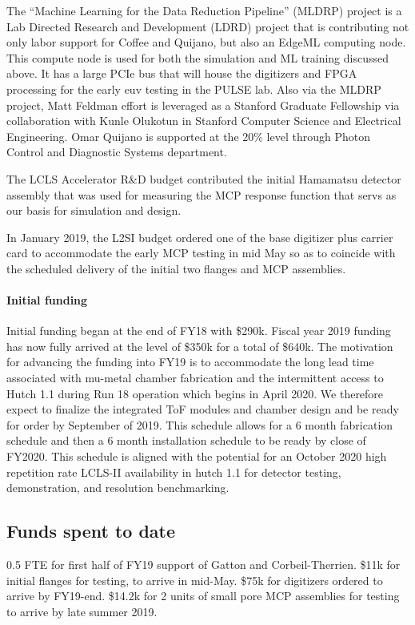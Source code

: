\documentclass[aps]{revtex4}
\begin{document}
The ``Machine Learning for the Data Reduction Pipeline'' (MLDRP) project is a Lab Directed Research and Development (LDRD) project that is contributing not only labor support for Coffee and Quijano, but also an EdgeML computing node.
This compute node is used for both the simulation and ML training discussed above.
It has a large PCIe bus that will house the digitizers and FPGA processing for the early euv testing in the PULSE lab.
Also via the MLDRP project, Matt Feldman effort is leveraged as a Stanford Graduate Fellowship via collaboration with Kunle Olukotun in Stanford Computer Science and Electrical Engineering.
Omar Quijano is supported at the 20\% level through Photon Control and Diagnostic Systems department.

The LCLS Accelerator R\&D budget contributed the initial Hamamatsu detector assembly that was used for measuring the MCP response function that servs as our basis for simulation and design. 

In January 2019, the L2SI budget ordered one of the base digitizer plus carrier card to accommodate the early MCP testing in mid May so as to coincide with the scheduled delivery of the initial two flanges and MCP assemblies.

\paragraph*{Initial funding}
Initial funding began at the end of FY18 with \$290k.  Fiscal year 2019 funding has now fully arrived at the level of \$350k for a total of \$640k. 
The motivation for advancing the funding into FY19 is to accommodate the long lead time associated with mu-metal chamber fabrication and the intermittent access to Hutch 1.1 during Run 18 operation which begins in April 2020.
We therefore expect to finalize the integrated ToF modules and chamber design and be ready for order by September of 2019.  
This schedule allows for a 6 month fabrication schedule and then a 6 month installation schedule to be ready by close of FY2020.
This schedule is aligned with the potential for an October 2020 high repetition rate LCLS-II availability in hutch 1.1 for detector testing, demonstration, and resolution benchmarking.

\subsection*{Funds spent to date}
0.5 FTE for first half of FY19 support of Gatton and Corbeil-Therrien.
\$11k for initial flanges for testing, to arrive in mid-May.
\$75k for digitizers ordered to arrive by FY19-end.
\$14.2k for 2 units of small pore MCP assemblies for testing to arrive by late summer 2019. 
\end{document}

